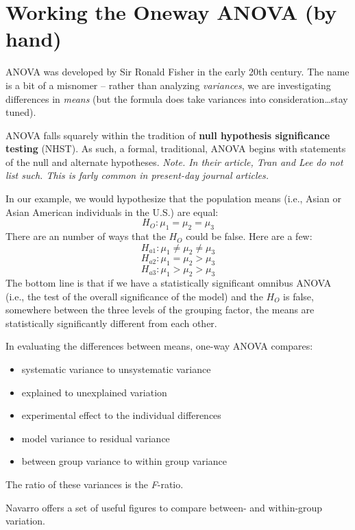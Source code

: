 \documentclass[
  11pt,
]{book}
\providecommand{\tightlist}{%
  \setlength{\itemsep}{0pt}\setlength{\parskip}{0pt}}
\begin{document}
\hypertarget{working-the-oneway-anova-by-hand}{%
\section{Working the Oneway ANOVA (by hand)}\label{working-the-oneway-anova-by-hand}}

ANOVA was developed by Sir Ronald Fisher in the early 20th century. The name is a bit of a misnomer -- rather than analyzing \emph{variances}, we are investigating differences in \emph{means} (but the formula does take variances into consideration\ldots stay tuned).

ANOVA falls squarely within the tradition of \textbf{null hypothesis significance testing} (NHST). As such, a formal, traditional, ANOVA begins with statements of the null and alternate hypotheses. \emph{Note. In their article, Tran and Lee \citeyearpar{tran_you_2014} do not list such. This is farly common in present-day journal articles.}

In our example, we would hypothesize that the population means (i.e., Asian or Asian American individuals in the U.S.) are equal: \[H_{O}: \mu _{1} = \mu _{2} = \mu _{3}\] There are an number of ways that the \(H_{O}\) could be false. Here are a few: \[H_{a1}: \mu _{1} \neq \mu _{2} \neq \mu _{3}\] \[H_{a2}: \mu _{1} = \mu _{2} > \mu _{3}\] \[H_{a3}: \mu _{1} > \mu _{2} > \mu _{3}\] The bottom line is that if we have a statistically significant omnibus ANOVA (i.e., the test of the overall significance of the model) and the \(H_{O}\) is false, somewhere between the three levels of the grouping factor, the means are statistically significantly different from each other.

In evaluating the differences between means, one-way ANOVA compares:

\begin{itemize}
\tightlist
\item
  systematic variance to unsystematic variance
\item
  explained to unexplained variation
\item
  experimental effect to the individual differences
\item
  model variance to residual variance
\item
  between group variance to within group variance
\end{itemize}

The ratio of these variances is the \emph{F}-ratio.

Navarro \citeyearpar{navarro_book_2020} offers a set of useful figures to compare between- and within-group variation.
\end{document}

